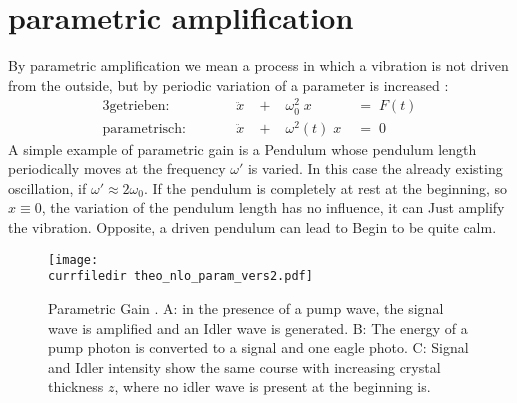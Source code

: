 
\section{parametric amplification}

By parametric amplification we mean a process in which
a vibration is not driven from the outside, but by
periodic variation of a parameter is increased
\cite{Milonni_lasers}:
\begin{alignat}{3}
  \text{getrieben:} &\qquad & \ddot{x} &\;+\; & \omega_0^2 \; x &\;=\;  F(t)  \\%
  \text{parametrisch:} && \ddot{x} &\;+\;& \omega^2(t) \; x &\;=\;   0
\end{alignat}
A simple example of parametric gain is a
Pendulum whose pendulum length periodically moves at the frequency $\omega'$
is varied. In this case the already
existing oscillation, if $\omega' \approx 2 \omega_0$. If
the pendulum is completely at rest at the beginning, so $x \equiv 0$,
the variation of the pendulum length has no influence, it can
Just amplify the vibration. Opposite, a driven pendulum can lead to
Begin to be quite calm.

\begin{figure}[b]
\center
\texttt{[image: \\currfiledir theo\_nlo\_param\_vers2.pdf]}
\caption{Parametric Gain
\cite{saleh_fundamentals_of_photonics}. A: in the presence of a
pump wave, the signal wave is amplified and an Idler wave
is generated. B: The energy of a pump photon is converted to a
signal and one eagle photo. C: Signal and
Idler intensity show the same course with increasing
crystal thickness $z$, where no idler wave is present at the beginning
is.} \label{abb_theo_nlo_param_verst}
\end{figure}

